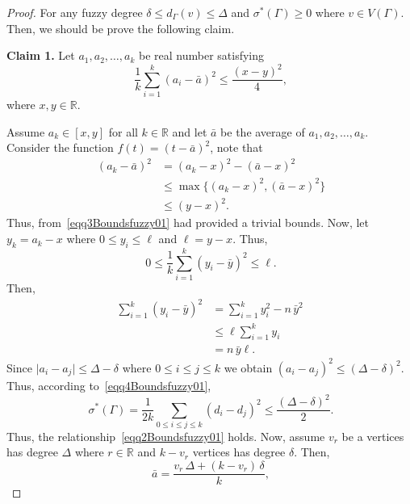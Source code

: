 \documentclass[12pt]{amsart}
\newcommand{\SF}{\sigma^*}
\begin{document}
\begin{proof}
For any fuzzy degree $\delta\leqslant d_\Gamma(v)\leqslant\Delta$ and $\SF(\Gamma)\geq 0$  where $v\in V(\Gamma)$. Then, we should be prove the following claim. 

\noindent \textbf{Claim 1.} Let $a_1,a_2,\dots,a_k$ be real number satisfying 
\begin{equation}~\label{eqq2Boundsfuzzy01}
\frac{1}{k}\sum_{i=1}^{k}(a_i-\bar{a})^2\leqslant \frac{(x-y)^2}{4},    
\end{equation}
where $x,y\in \mathbb{R}$. 

Assume $a_k\in [x,y]$ for all $k\in \mathbb{R}$ and let $\bar{a}$ be the average of $a_1,a_2,\dots,a_k$. Consider the function $f(t)=(t-\bar{a})^2$, note that 
\begin{equation}~\label{eqq3Boundsfuzzy01}
\begin{aligned}
(a_k-\bar{a})^2&=(a_k-x)^2-(\bar{a}-x)^2\\
&\leqslant \max\{(a_k-x)^2,(\bar{a}-x)^2 \}\\
&\leqslant (y-x)^2.
\end{aligned}
\end{equation}
Thus, from~\eqref{eqq3Boundsfuzzy01} had provided a trivial bounds. Now, let $y_k=a_k-x$ where $0\leq y_i\leq \ell$ and $\ell=y-x$. Thus, 
\begin{equation}~\label{eqq4Boundsfuzzy01}
0\leq \frac{1}{k}\sum_{i=1}^{k}(y_i-\bar{y})^2\leq \ell. 
\end{equation}
Then, 
\begin{align*}
\sum_{i=1}^{k}(y_i-\bar{y})^2 &=\sum_{i=1}^{k}y_i^2-n\,\bar{y}^2\\
&\leqslant \ell \sum_{i=1}^{k}y_i \\
&=n\,\bar{y}\ell.
\end{align*}
Since $\lvert a_i-a_j\rvert \leqslant \Delta-\delta$ where $0\leq i\leq j\leq k$ we obtain $(a_i-a_j)^2\leqslant (\Delta-\delta)^2$. Thus, according to~\eqref{eqq4Boundsfuzzy01}, 
\begin{equation}~\label{eqq5Boundsfuzzy01}
\SF(\Gamma)=\frac{1}{2k}\sum_{0\leq i\leq j\leq k}(d_i-d_j)^2 \leqslant \frac{(\Delta-\delta)^2}{2}.
\end{equation}
Thus, the relationship~\eqref{eqq2Boundsfuzzy01} holds. 
Now, assume $v_r$ be a vertices has degree $\Delta$ where $r\in \mathbb{R}$ and $k-v_r$ vertices has degree $\delta$. Then, 
\begin{equation}~\label{eqq6Boundsfuzzy01}
\bar{a}=\frac{v_r\,\Delta+(k-v_r)\,\delta}{k},
\end{equation}

\end{proof}
\end{document}
